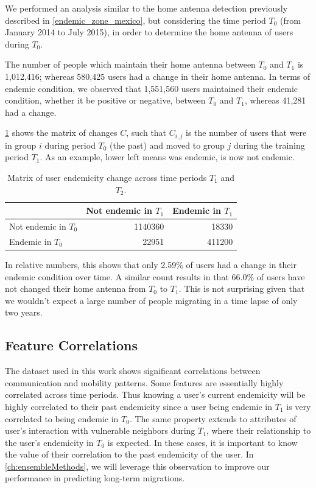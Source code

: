 We performed an analysis similar to the home antenna detection previously described in \cref{endemic_zone_mexico}, but considering the time period $T_0$ (from January 2014 to July 2015), in order to determine the home antenna of users during $T_0$.

The number of people which maintain their home antenna between $T_0$ and $T_1$ is 1,012,416; whereas 580,425 users had a change in their home antenna.
In terms of endemic condition, we observed that 1,551,560 users maintained their endemic condition, whether it be positive or negative, between $T_0$ and $T_1$, whereas 41,281 had a change.


\cref{tab:changes} shows the matrix of changes $C$, such that $C_{i, j}$ is the number of users that were in group $i$ during period $T_0$ (the past) and moved to group $j$ during the training period $T_1$.
As an example, lower left means was endemic, is now not endemic.

\begin{table}[ht]
	\caption{Matrix of user endemicity change across time periods $T_1$ and $T_2$.}\label{tab:changes}
	\centering
	\begin{tabular}{l r r }
		\toprule
		& Not endemic in $T_1$ & Endemic in $T_1$ \\
		\midrule
		Not endemic in $T_0$ & 1140360 & 18330   \\
		Endemic in $T_0$       & 22951    & 411200 \\
		\bottomrule
	\end{tabular}
\end{table}

In relative numbers, this shows that only 2.59\% of users had a change in their endemic condition over time.
A similar count results in that 66.0\% of users have not changed their home antenna from $T_0$ to $T_1$.
This is not surprising given that we wouldn't expect a large number of people migrating in a time lapse of only two years.


\subsection{Feature Correlations}
\label{subsection:feature_correlations} %


The dataset used in this work shows significant correlations between communication and mobility patterns.
Some features are essentially highly correlated across time periods.
Thus knowing a user's current endemicity will be highly correlated to their past endemicity since a user being endemic in $T_1$ is very correlated to being endemic in $T_0$.
The same property extends to attributes of user's interaction with vulnerable neighbors during $T_1$, where their relationship to the user's endemicity in $T_0$ is expected.
In these cases, it is important to know the value of their correlation to the past endemicity of the user.
In \cref{ch:ensembleMethods}, we will leverage this observation to improve our performance in predicting long-term migrations.

